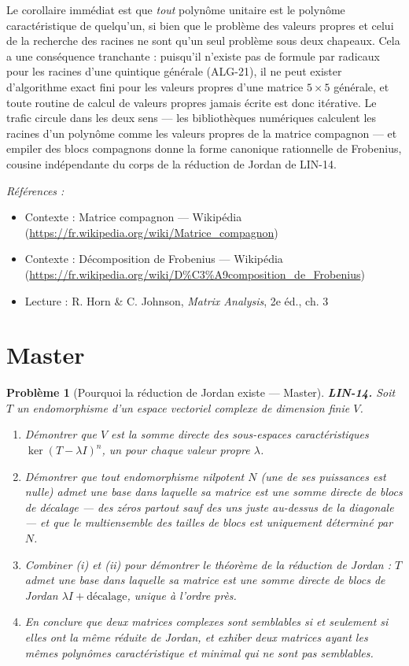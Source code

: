 \documentclass[11pt]{article}
\newtheorem{problem}{Problème}
\newenvironment{refs}{\par\small\noindent\emph{Références :}\begin{itemize}\setlength\itemsep{0pt}}{\end{itemize}\normalsize}
\begin{document}
\noindent Le corollaire immédiat est que \textit{tout} polynôme unitaire est le polynôme
caractéristique de quelqu'un, si bien que le problème des valeurs propres et celui de la recherche
des racines ne sont qu'un seul problème sous deux chapeaux. Cela a une conséquence tranchante :
puisqu'il n'existe pas de formule par radicaux pour les racines d'une quintique générale (ALG-21), il
ne peut exister d'algorithme exact fini pour les valeurs propres d'une matrice $5 \times 5$
générale, et toute routine de calcul de valeurs propres jamais écrite est donc itérative. Le trafic
circule dans les deux sens --- les bibliothèques numériques calculent les racines d'un polynôme comme
les valeurs propres de la matrice compagnon --- et empiler des blocs compagnons donne la forme
canonique rationnelle de Frobenius, cousine indépendante du corps de la réduction de Jordan de
LIN-14.

\begin{refs}
\item Contexte : Matrice compagnon --- Wikipédia (\url{https://fr.wikipedia.org/wiki/Matrice_compagnon})
\item Contexte : Décomposition de Frobenius --- Wikipédia (\url{https://fr.wikipedia.org/wiki/D%C3%A9composition_de_Frobenius})
\item Lecture : R. Horn \& C. Johnson, \textit{Matrix Analysis}, 2e éd., ch. 3
\end{refs}

\bigskip


\section*{Master}

\begin{problem}[{Pourquoi la réduction de Jordan existe --- Master}]
\textbf{LIN-14.} Soit $T$ un endomorphisme d'un espace vectoriel
complexe de dimension finie $V$.
\begin{enumerate}
\item[(i)] Démontrer que $V$ est la somme directe des \textit{sous-espaces
caractéristiques} $\ker (T - \lambda I)^n$, un pour chaque valeur propre $\lambda$.
\item[(ii)] Démontrer
que tout endomorphisme nilpotent $N$ (une de ses puissances est nulle) admet une base dans laquelle
sa matrice est une somme directe de \og{} blocs de décalage \fg{} --- des zéros partout sauf des uns juste
au-dessus de la diagonale --- et que le multiensemble des tailles de blocs est uniquement déterminé par
$N$.
\item[(iii)] Combiner (i) et (ii) pour
démontrer le théorème de la réduction de Jordan : $T$ admet une base dans laquelle sa matrice est
une somme directe de blocs de Jordan $\lambda I + \text{décalage}$, unique à l'ordre près.
\item[(iv)] En conclure que deux matrices
complexes sont semblables si et seulement si elles ont la même réduite de Jordan, et exhiber deux
matrices ayant les mêmes polynômes caractéristique \textit{et} minimal qui ne sont pas semblables.
\end{enumerate}

\end{problem}
\end{document}
